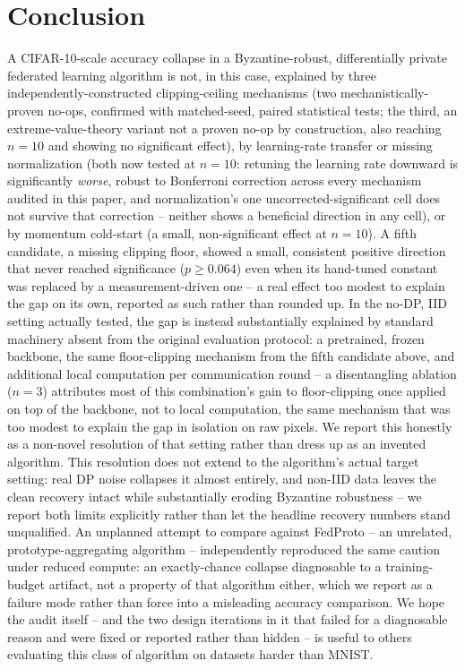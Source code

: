 \documentclass{article}
\begin{document}
\section{Conclusion}
\label{sec:conclusion}

A CIFAR-10-scale accuracy collapse in a Byzantine-robust, differentially private
federated learning algorithm is not, in this case, explained by three
independently-constructed clipping-ceiling mechanisms (two mechanistically-proven
no-ops, confirmed with matched-seed, paired statistical tests; the third, an
extreme-value-theory variant not a proven no-op by construction, also reaching
$n{=}10$ and showing no significant effect), by learning-rate transfer or
missing normalization (both now tested at $n{=}10$: retuning the learning rate
downward is significantly \emph{worse}, robust to Bonferroni correction across
every mechanism audited in this paper, and normalization's one
uncorrected-significant cell does not survive that correction -- neither shows
a beneficial direction in any cell), or by momentum cold-start (a small,
non-significant effect at $n{=}10$). A fifth candidate, a missing clipping
floor, showed a small, consistent positive direction that never reached
significance ($p \geq 0.064$) even when its hand-tuned constant was replaced by
a measurement-driven one -- a real effect too modest to explain the gap on its
own, reported as such rather than rounded up. In the no-DP, IID setting
actually tested, the gap is instead substantially explained by standard
machinery absent from the original evaluation protocol: a pretrained, frozen
backbone, the same floor-clipping mechanism from the fifth candidate above,
and additional local computation per communication round -- a disentangling
ablation ($n{=}3$) attributes most of this combination's gain to floor-clipping
once applied on top of the backbone, not to local computation, the same
mechanism that was too modest to explain the gap in isolation on raw pixels.
We report this honestly as a non-novel resolution of that setting rather than
dress up as an invented algorithm. This resolution does not extend to the algorithm's
actual target setting: real DP noise collapses it almost entirely, and
non-IID data leaves the clean recovery intact while substantially eroding
Byzantine robustness -- we report both limits explicitly rather than let the
headline recovery numbers stand unqualified. An unplanned attempt to compare
against FedProto
\citep{tan2022fedproto} -- an unrelated, prototype-aggregating algorithm --
independently reproduced the same caution under reduced compute: an
exactly-chance collapse diagnosable to a training-budget artifact, not a
property of that algorithm either, which we report as a failure mode rather
than force into a misleading accuracy comparison. We hope the audit itself --
and the two design iterations in it that failed for a diagnosable reason and
were fixed or reported rather than hidden -- is useful to others evaluating
this class of algorithm on datasets harder than MNIST.



\end{document}
